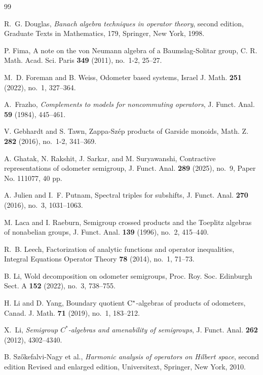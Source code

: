 \documentclass[12pt]{amsart}
\theoremstyle{definition}
\theoremstyle{remark}
\numberwithin{equation}{section}
\begin{document}
\begin{thebibliography}{99}
        
R.~G. Douglas, {\it Banach algebra techniques in operator theory}, second edition, Graduate Texts in Mathematics, 179, Springer, New York, 1998.

P. Fima, A note on the von Neumann algebra of a Baumslag-Solitar group, C. R. Math. Acad. Sci. Paris {\bf 349} (2011), no.~1-2, 25--27.

M.~D. Foreman and B. Weiss, Odometer based systems, Israel J. Math. {\bf 251} (2022), no.~1, 327--364.

A.~Frazho,
\textit{Complements to models for noncommuting operators},
J. Funct. Anal. \textbf{59} (1984), 445--461.


V. Gebhardt and S. Tawn, Zappa-Sz\'ep products of Garside monoids, Math. Z. {\bf 282} (2016), no.~1-2, 341--369.


A. Ghatak, N. Rakshit, J. Sarkar, and M. Suryawanshi, Contractive representations of odometer semigroup, J. Funct. Anal. {\bf 289} (2025), no.~9, Paper No. 111077, 40 pp.



A. Julien and I.~F. Putnam, Spectral triples for subshifts, J. Funct. Anal. {\bf 270} (2016), no.~3, 1031--1063.

M. Laca and I. Raeburn, Semigroup crossed products and the Toeplitz algebras of nonabelian groups, J. Funct. Anal. {\bf 139} (1996), no.~2, 415--440.


R.~B. Leech, Factorization of analytic functions and operator inequalities, Integral Equations Operator Theory {\bf 78} (2014), no.~1, 71--73.





B. Li, Wold decomposition on odometer semigroups, Proc. Roy. Soc. Edinburgh Sect. A {\bf 152} (2022), no.~3, 738--755.

H. Li and D. Yang, Boundary quotient $\rm C^*$-algebras of products of odometers, Canad. J. Math. {\bf 71} (2019), no.~1, 183--212.


X.~Li, \textit{Semigroup $C^*$-algebras and amenability of semigroups}, J. Funct. Anal. \textbf{262} (2012), 4302--4340.


B. Sz\H okefalvi-Nagy et al., {\it Harmonic analysis of operators on Hilbert space}, second edition Revised and enlarged edition, Universitext, Springer, New York, 2010.


\end{thebibliography}
\end{document}
